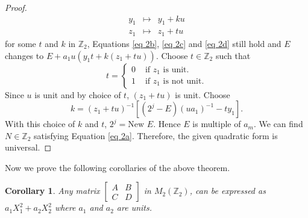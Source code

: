 \documentclass[12pt,a4paper]{article}
\newtheorem{cor}{Corollary}[section]
\begin{document}
\begin{proof}
		\begin{eqnarray*}
			y_1 &\mapsto& y_1+ku\\
			z_1 &\mapsto& z_1+tu
		\end{eqnarray*}
		for some $t$ and $k$ in $\mathbb{Z}_2$, Equations \eqref{eq 2b}, \eqref{eq 2c} and \eqref{eq 2d} still hold and $E$ changes to $E+a_1u(y_1t+k(z_1+tu))$. Choose $t \in \mathbb{Z}_2$ such that 
		\begin{equation*}
			t= \begin{cases}
				0 &\mbox{ if } z_1 \mbox{ is unit.}\\
				1 &\mbox{ if } z_1 \mbox{ is not unit.}
			\end{cases}
		\end{equation*}
		Since $u$ is unit and by choice of $t$, $(z_1+tu)$ is unit. Choose $$k=(z_1+tu)^{-1}[(2^j-E)(ua_1)^{-1} -ty_1].$$
		With this choice of $k$ and $t$, $2^j = \mbox{New }E$. Hence $E$ is multiple of $a_m$. We can find $N \in \mathbb{Z}_2$ satisfying Equation \eqref{eq 2a}. Therefore, the given quadratic form is universal.
	\end{proof}
	Now we prove the following corollaries of the above theorem.
	\begin{cor} \label{cor f(2) for p=2}
		Any matrix $ \begin{bmatrix}
			A & B  \\
			C & D  
		\end{bmatrix} $ in $M_2(\mathbb{Z}_2)$, can be expressed as $a_1 X_1^2 + a_2 X_2^2$ where $a_1$ and $a_2$ are units.
	\end{cor}
\end{document}
